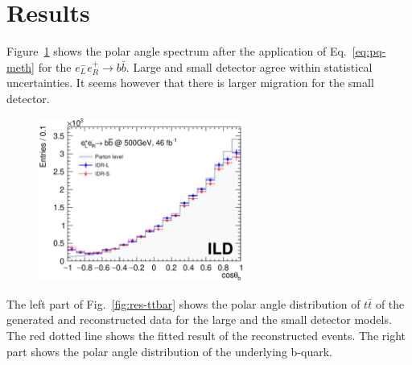 \documentclass[preprint]{elsarticle}
\begin{document}







\section{Results}
 
Figure~\ref{results_bb} shows the polar angle spectrum after the application of Eq.~\ref{eq:pq-meth} for the $e_{L}^{-}e_{R}^{+}\rightarrow b\bar{b}$. Large and small detector agree within statistical uncertainties. It seems however that there is larger migration for the small detector.  

 \begin{figure}[h!]
\centering
  \includegraphics[width=0.6\textwidth]{figures_BBbar/result2models_v2.eps} 
\caption{}
\label{results_bb}
\end{figure}


The left part of Fig.~\ref{fig:res-ttbar} shows the polar angle distribution of $t\bar{t}$ of the generated and reconstructed data for the large and the small detector models. The red dotted line shows the fitted result of the reconstructed events. The right part shows the polar angle distribution of the underlying b-quark. 
\end{document}
